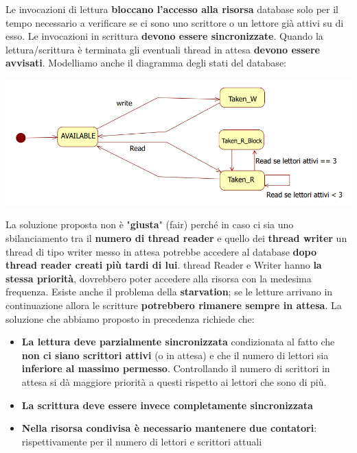 \documentclass[12pt]{article}
\begin{document}
Le invocazioni di lettura \textbf{bloccano l'accesso alla risorsa} database solo per il tempo necessario a verificare se ci sono uno scrittore o un lettore già attivi su di esso. Le invocazioni in scrittura \textbf{devono essere sincronizzate}. Quando la lettura/scrittura è terminata gli eventuali thread in attesa \textbf{devono essere avvisati}. Modelliamo anche il diagramma degli stati del database:
\begin{center}
    \includegraphics[width = 1\textwidth]{Images/111.PNG}
\end{center}
La soluzione proposta non è "\textbf{giusta}" (fair) perché in caso ci sia uno sbilanciamento tra il \textbf{numero di thread reader} e quello dei \textbf{thread writer} un thread di tipo writer messo in attesa potrebbe accedere al database \textbf{dopo thread reader creati più tardi di lui}. thread Reader e Writer hanno \textbf{la stessa priorità}, dovrebbero poter accedere alla risorsa con la medesima frequenza. Esiste anche il problema della \textbf{starvation}; se le letture arrivano in continuazione allora le scritture \textbf{potrebbero rimanere sempre in attesa}. La soluzione che abbiamo proposto in precedenza richiede che:
\begin{itemize}
    \item \textbf{La lettura deve parzialmente sincronizzata} condizionata al fatto che \textbf{non ci siano scrittori attivi} (o in attesa) e che il numero di lettori sia \textbf{inferiore al massimo permesso}. Controllando il numero di scrittori in attesa si dà maggiore priorità a questi rispetto ai lettori che sono di più.
    \item \textbf{La scrittura deve essere invece completamente sincronizzata}
    \item \textbf{Nella risorsa condivisa è necessario mantenere due contatori}:  rispettivamente per il numero di lettori e scrittori attuali
\end{itemize}
\end{document}
